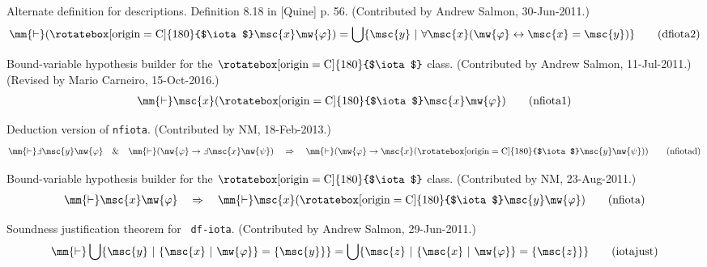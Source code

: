 \begin{lemma} Alternate definition for descriptions. 
Definition 8.18 in [Quine]
       p. 56.  (Contributed by Andrew Salmon, 30-Jun-2011.)
\begin{align}
\mm{\vdash} ( \mathrm{\rotatebox[origin=C]{180}{$\iota$}} \msc{x} \mw{\varphi}
    ) = \bigcup \{ \msc{y} ~\vert~ \forall \msc{x} ( \mw{\varphi}
    \leftrightarrow \msc{x} = \msc{y} ) \}\label{eq:dfiota2}\tag{dfiota2}
\end{align}
\end{lemma}


\begin{lemma} Bound-variable hypothesis builder for the
$\mathrm{\rotatebox[origin=C]{180}{$\iota$}}$ class.  (Contributed
       by Andrew Salmon, 11-Jul-2011.)  (Revised by Mario Carneiro,
       15-Oct-2016.)
\begin{align}
\mm{\vdash} %
\msc{x} (
    \mathrm{\rotatebox[origin=C]{180}{$\iota$}} \msc{x} \mw{\varphi}
    )\label{eq:nfiota1}\tag{nfiota1}
\end{align}
\end{lemma}


\begin{lemma} Deduction version of {\tt nfiota}. 
(Contributed by NM, 18-Feb-2013.)
\begin{align}
\mm{\vdash} \Finv 
\msc{y} \mw{\varphi}\quad\&\quad \mm{\vdash} ( \mw{\varphi}
    \rightarrow \Finv 
    \msc{x} \mw{\psi} )\quad\Rightarrow\quad \mm{\vdash} (
    \mw{\varphi} \rightarrow %
    \msc{x} (
    \mathrm{\rotatebox[origin=C]{180}{$\iota$}} \msc{y} \mw{\psi} )
    )\label{eq:nfiotad}\tag{nfiotad}
\end{align}
\end{lemma}


\begin{lemma} Bound-variable hypothesis builder for the
$\mathrm{\rotatebox[origin=C]{180}{$\iota$}}$ class.  (Contributed
       by NM, 23-Aug-2011.)
\begin{align}
\mm{\vdash} %
\msc{x} \mw{\varphi}\quad\Rightarrow\quad \mm{\vdash}
  \msc{x} ( \mathrm{\rotatebox[origin=C]{180}{$\iota$}}
    \msc{y} \mw{\varphi} )\label{eq:nfiota}\tag{nfiota}
\end{align}
\end{lemma}


\begin{lemma} Soundness justification theorem for {\tt
df-iota}.  (Contributed by Andrew
       Salmon, 29-Jun-2011.)
\begin{align}
\mm{\vdash} \bigcup \{ \msc{y} ~\vert~ \{ \msc{x} ~\vert~ \mw{\varphi} \} = \{
    \msc{y} \} \} = \bigcup \{ \msc{z} ~\vert~ \{ \msc{x} ~\vert~ \mw{\varphi}
    \} = \{ \msc{z} \} \}\label{eq:iotajust}\tag{iotajust}
\end{align}
\end{lemma}


